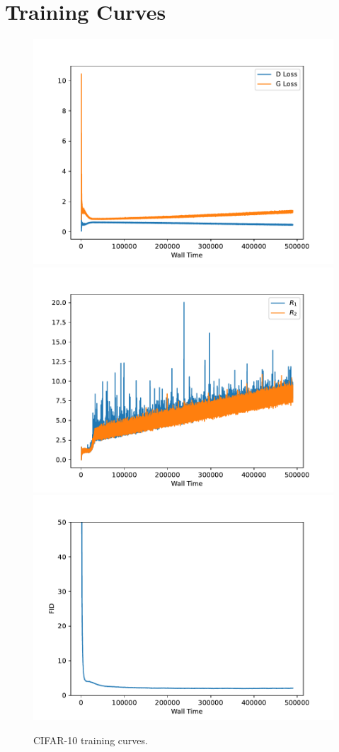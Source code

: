 \section{Training Curves}
\vspace{-0.25cm}
\begin{figure}[h!]
    \centering    
    \includegraphics[width=0.32\linewidth]{figures/train_curves/c10/loss.pdf}%
    \includegraphics[width=0.32\linewidth]{figures/train_curves/c10/r1r2.pdf}%
    \includegraphics[width=0.32\linewidth]{figures/train_curves/c10/fid.pdf}
    \caption{CIFAR-10 training curves.}
    \label{fig:cifar10_trainingcurve}
    \vspace{-0.3cm}
\end{figure}

